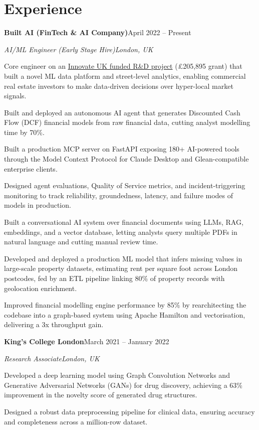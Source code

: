 \documentclass[10pt,a4paper]{article}
\newcommand{\entry}[4]{%
  {\color{company}\bfseries #1}\hfill {\color{muted}#2}\par
  \vspace{1pt}
  {\itshape #3}\hfill {\color{muted}\itshape #4}\par
  \vspace{3pt}%
}
\begin{document}
\section{Experience}
\entry{Built AI (FinTech \& AI Company)}{April 2022 -- Present}{AI/ML Engineer (Early Stage Hire)}{London, UK}
\begin{tight}
  \item Core engineer on an \href{https://gtr.ukri.org/projects?ref=10022996}{Innovate UK funded R\&D project} (\pounds205,895 grant) that built a novel ML data platform and street-level analytics, enabling commercial real estate investors to make data-driven decisions over hyper-local market signals.
  \item Built and deployed an autonomous AI agent that generates Discounted Cash Flow (DCF) financial models from raw financial data, cutting analyst modelling time by 70\%.
  \item Built a production MCP server on FastAPI exposing 180+ AI-powered tools through the Model Context Protocol for Claude Desktop and Glean-compatible enterprise clients.
  \item Designed agent evaluations, Quality of Service metrics, and incident-triggering monitoring to track reliability, groundedness, latency, and failure modes of models in production.
  \item Built a conversational AI system over financial documents using LLMs, RAG, embeddings, and a vector database, letting analysts query multiple PDFs in natural language and cutting manual review time.
  \item Developed and deployed a production ML model that infers missing values in large-scale property datasets, estimating rent per square foot across London postcodes, fed by an ETL pipeline linking 80\% of property records with geolocation enrichment.
  \item Improved financial modelling engine performance by 85\% by rearchitecting the codebase into a graph-based system using Apache Hamilton and vectorisation, delivering a 3x throughput gain.
\end{tight}

\entry{King's College London}{March 2021 -- January 2022}{Research Associate}{London, UK}
\begin{tight}
  \item Developed a deep learning model using Graph Convolution Networks and Generative Adversarial Networks (GANs) for drug discovery, achieving a 63\% improvement in the novelty score of generated drug structures.
  \item Designed a robust data preprocessing pipeline for clinical data, ensuring accuracy and completeness across a million-row dataset.
\end{tight}
\end{document}
